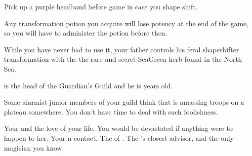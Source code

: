 \documentclass[char]{NeptuneBall}
\begin{document}
\begin{itemz}[Notes]
  \item Pick up a purple headband before game in case you shape shift.
  \item Any transformation potion you acquire will lose potency at the end of the game, so you will have to administer the potion before then.
\end{itemz}

\begin{itemz}[Trivia]
	\item While you have never had to use it, your father controls his feral shapeshifter transformation with the the rare and secret SeaGreen herb found in the North Sea.
  \item \cKratos{} is the head of the Guardian's Guild and he is \cKratos{\MYnumber} years old.
	\item Some alarmist junior members of your guild think that \pIndia{} is amassing troops on a plateau somewhere. You don't have time to deal with such foolishness.
\end{itemz}

\begin{contacts}
  \contact{\cQueen{}} Your \cQueen{\spouse} and the love of your life. You would be devastated if anything were to happen to her.
  \contact{\cSpy{}} Your \pPacifica{}n contact.
  \contact{\cKing{}} The \cKing{\King} of \pAtlantis{}.
  \contact{\cManta{}} The \cKing{\King}'s closest advisor, and the only magician you know.
\end{contacts}
\end{document}
